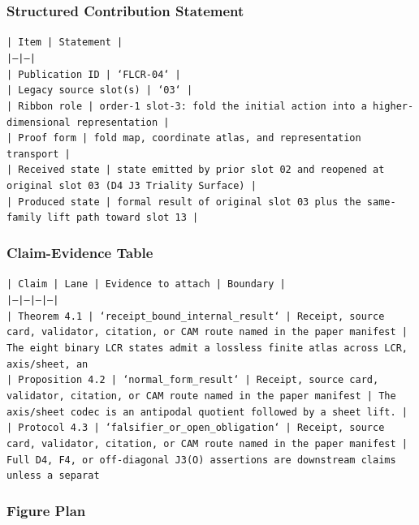 \documentclass[11pt]{article}
\begin{document}
\subsubsection*{Structured Contribution Statement}

\noindent\texttt{| Item | Statement |}\\
\noindent\texttt{|---|---|}\\
\noindent\texttt{| Publication ID | `FLCR-04` |}\\
\noindent\texttt{| Legacy source slot(s) | `03` |}\\
\noindent\texttt{| Ribbon role | order-1 slot-3: fold the initial action into a higher-dimensional representation |}\\
\noindent\texttt{| Proof form | fold map, coordinate atlas, and representation transport |}\\
\noindent\texttt{| Received state | state emitted by prior slot 02 and reopened at original slot 03 (D4 J3 Triality Surface) |}\\
\noindent\texttt{| Produced state | formal result of original slot 03 plus the same-family lift path toward slot 13 |}\\

\subsubsection*{Claim-Evidence Table}

\noindent\texttt{| Claim | Lane | Evidence to attach | Boundary |}\\
\noindent\texttt{|---|---|---|---|}\\
\noindent\texttt{| Theorem 4.1 | `receipt\_bound\_internal\_result` | Receipt, source card, validator, citation, or CAM route named in the paper manifest | The eight binary LCR states admit a lossless finite atlas across LCR, axis/sheet, an}\\
\noindent\texttt{| Proposition 4.2 | `normal\_form\_result` | Receipt, source card, validator, citation, or CAM route named in the paper manifest | The axis/sheet codec is an antipodal quotient followed by a sheet lift. |}\\
\noindent\texttt{| Protocol 4.3 | `falsifier\_or\_open\_obligation` | Receipt, source card, validator, citation, or CAM route named in the paper manifest | Full D4, F4, or off-diagonal J3(O) assertions are downstream claims unless a separat}\\

\subsubsection*{Figure Plan}
\end{document}
